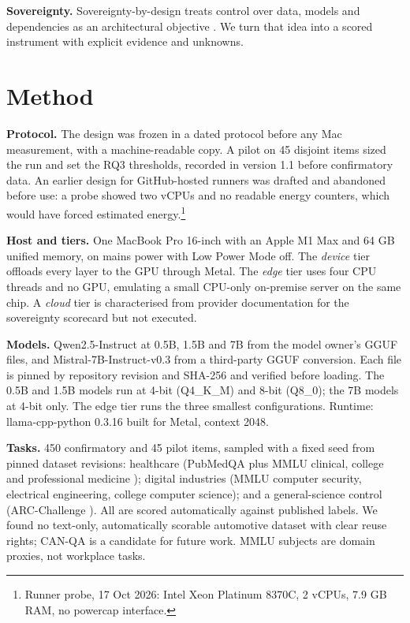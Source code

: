 \documentclass[10pt,twocolumn]{article}
\begin{document}
\textbf{Sovereignty.} Sovereignty-by-design treats control over data, models and dependencies as an architectural objective \cite{esposito2026}. We turn that idea into a scored instrument with explicit evidence and unknowns.

\section{Method}\label{sec:method}
\textbf{Protocol.} The design was frozen in a dated protocol before any Mac measurement, with a machine-readable copy. A pilot on 45 disjoint items sized the run and set the RQ3 thresholds, recorded in version 1.1 before confirmatory data. An earlier design for GitHub-hosted runners was drafted and abandoned before use: a probe showed two vCPUs and no readable energy counters, which would have forced estimated energy.\footnote{Runner probe, 17 Oct 2026: Intel Xeon Platinum 8370C, 2 vCPUs, 7.9 GB RAM, no powercap interface.}

\textbf{Host and tiers.} One MacBook Pro 16-inch with an Apple M1 Max and 64 GB unified memory, on mains power with Low Power Mode off. The \emph{device} tier offloads every layer to the GPU through Metal. The \emph{edge} tier uses four CPU threads and no GPU, emulating a small CPU-only on-premise server on the same chip. A \emph{cloud} tier is characterised from provider documentation for the sovereignty scorecard but not executed.

\textbf{Models.} Qwen2.5-Instruct at 0.5B, 1.5B and 7B \cite{qwen25} from the model owner's GGUF files, and Mistral-7B-Instruct-v0.3 \cite{mistral7b} from a third-party GGUF conversion. Each file is pinned by repository revision and SHA-256 and verified before loading. The 0.5B and 1.5B models run at 4-bit (Q4\_K\_M) and 8-bit (Q8\_0); the 7B models at 4-bit only. The edge tier runs the three smallest configurations. Runtime: llama-cpp-python 0.3.16 built for Metal, context 2048.

\textbf{Tasks.} 450 confirmatory and 45 pilot items, sampled with a fixed seed from pinned dataset revisions: healthcare (PubMedQA \cite{pubmedqa} plus MMLU clinical, college and professional medicine \cite{mmlu}); digital industries (MMLU computer security, electrical engineering, college computer science); and a general-science control (ARC-Challenge \cite{arc}). All are scored automatically against published labels. We found no text-only, automatically scorable automotive dataset with clear reuse rights; CAN-QA \cite{canqa} is a candidate for future work. MMLU subjects are domain proxies, not workplace tasks.
\end{document}

